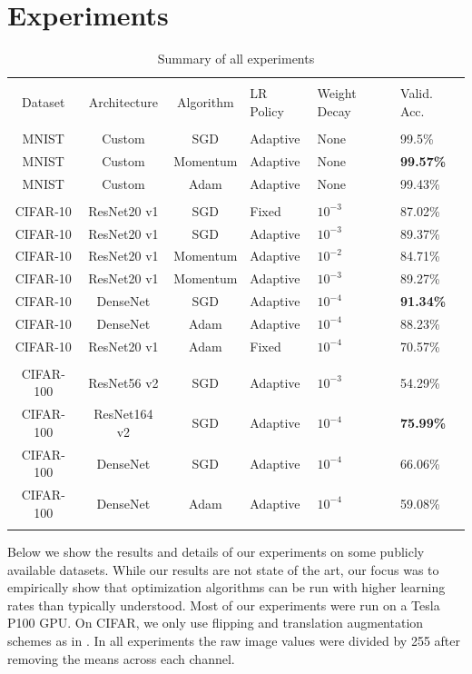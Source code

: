 \documentclass{article}
\begin{document}
\section{Experiments}
\begin{table}
    \centering
    \caption{Summary of all experiments}
    \begin{tabularx}{\textwidth}{cccYYY}
        \toprule \\
        Dataset & Architecture & Algorithm & LR Policy & Weight Decay & Valid. Acc. \\
        \midrule \\
        MNIST & Custom & SGD & Adaptive & None & 99.5\% \\
        MNIST & Custom & Momentum & Adaptive & None & \textbf{99.57\%} \\
        MNIST & Custom & Adam & Adaptive & None & 99.43\% \\
        \midrule \\
        CIFAR-10 & ResNet20 v1 & SGD & Fixed & $10^{-3}$ & 87.02\% \\
        CIFAR-10 & ResNet20 v1 & SGD & Adaptive & $10^{-3}$ & 89.37\% \\
        CIFAR-10 & ResNet20 v1 & Momentum & Adaptive & $10^{-2}$ & 84.71\% \\
        CIFAR-10 & ResNet20 v1 & Momentum & Adaptive & $10^{-3}$ & 89.27\% \\
        CIFAR-10 & DenseNet & SGD & Adaptive & $10^{-4}$ & \textbf{91.34\%} \\
        CIFAR-10 & DenseNet & Adam & Adaptive & $10^{-4}$ & 88.23\% \\
        CIFAR-10 & ResNet20 v1 & Adam & Fixed & $10^{-4}$ & 70.57\% \\
        \midrule \\
        CIFAR-100 & ResNet56 v2 & SGD & Adaptive & $10^{-3}$ & 54.29\% \\
        CIFAR-100 & ResNet164 v2 & SGD & Adaptive & $10^{-4}$ & \textbf{75.99\%} \\
        CIFAR-100 & DenseNet & SGD & Adaptive & $10^{-4}$ & 66.06\% \\
        CIFAR-100 & DenseNet & Adam & Adaptive & $10^{-4}$ & 59.08\% \\
        \bottomrule \\
    \end{tabularx}
    \label{tab:exp:summary}
\end{table}

Below we show the results and details of our experiments on some publicly available datasets. While our results are not state of the art, our focus was to empirically show that optimization algorithms can be run with higher learning rates than typically understood. Most of our experiments were run on a Tesla P100 GPU. On CIFAR, we only use flipping and translation augmentation schemes as in \cite{he2016deep}. In all experiments the raw image values were divided by 255 after removing the means across each channel.
\end{document}

